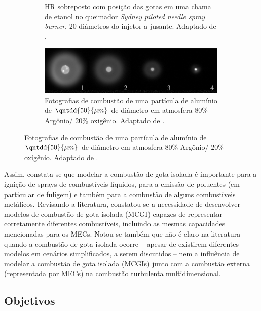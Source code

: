 \begin{figure}[H]
\begin{subfigure}[t]{0.59\textwidth}
        \vfill
        \caption{HR sobreposto com posição das gotas em uma chama de etanol no queimador \emph{Sydney piloted needle spray burner}, 20 diâmetros do injetor a jusante. Adaptado de \cite[Fig. 10]{SinghG2020}.}
        \label{fig:SinghG2020-10}
    \end{subfigure}
    \vspace{0.5cm}
    \begin{subfigure}[b]{0.8\textwidth}
        \centering
        \includegraphics[width=0.99\textwidth]{30_images/Braconnier202PhD-5.20.png}
        \caption{Fotografias de combustão de uma partícula de alumínio de $\qntdd{50}{\mu m}$ de diâmetro em atmosfera 80\% Argônio/ 20\% oxigênio. Adaptado de \cite[Fig. 5.21]{Braconnier2022}.}
        \label{fig:Braconnier202PhD-5.20}
    \end{subfigure}
    \label{fig:sdc-exp}
\end{figure}

Assim, constata-se que modelar a combustão de gota isolada é importante para a ignição de sprays de combustíveis líquidos, para a emissão de poluentes (em particular de fuligem) e também para a combustão de alguns combustíveis metálicos. 
Revisando a literatura, constatou-se a necessidade de desenvolver modelos de combustão de gota isolada (MCGI) capazes de representar corretamente diferentes combustíveis, incluindo as mesmas capacidades mencionadas para os MECs.
Notou-se também que não é claro na literatura quando a combustão de gota isolada ocorre \cite[p. 8]{JennyB2012} -- apesar de existirem diferentes modelos em cenários simplificados, a serem discutidos -- nem a influência de modelar a combustão de gota isolada (MCGIs) junto com a combustão externa (representada por MECs) na combustão turbulenta multidimensional.


\subsection{Objetivos} \label{sec:objetivos}

